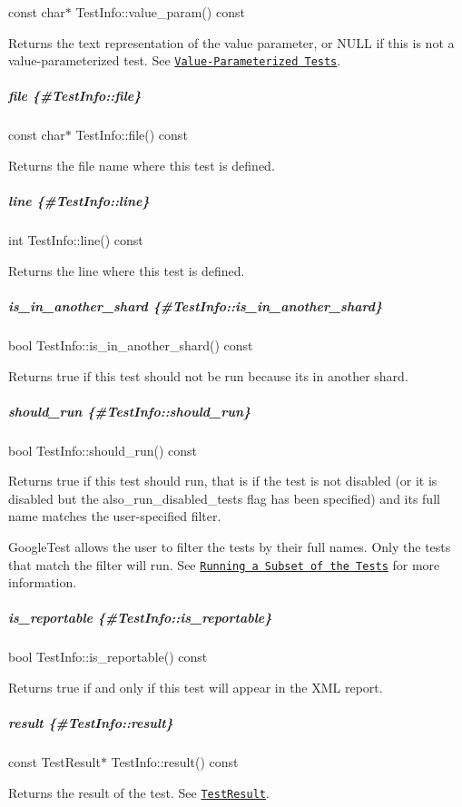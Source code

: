 {\ttfamily const char$\ast$ Test\+Info\+::value\+\_\+param() const}

Returns the text representation of the value parameter, or {\ttfamily N\+U\+LL} if this is not a value-\/parameterized test. See \href{../advanced.md#value-parameterized-tests}{\tt Value-\/\+Parameterized Tests}.

\subparagraph*{file \{\#\+Test\+Info\+::file\}}

{\ttfamily const char$\ast$ Test\+Info\+::file() const}

Returns the file name where this test is defined.

\subparagraph*{line \{\#\+Test\+Info\+::line\}}

{\ttfamily int Test\+Info\+::line() const}

Returns the line where this test is defined.

\subparagraph*{is\+\_\+in\+\_\+another\+\_\+shard \{\#\+Test\+Info\+::is\+\_\+in\+\_\+another\+\_\+shard\}}

{\ttfamily bool Test\+Info\+::is\+\_\+in\+\_\+another\+\_\+shard() const}

Returns true if this test should not be run because it\textquotesingle{}s in another shard.

\subparagraph*{should\+\_\+run \{\#\+Test\+Info\+::should\+\_\+run\}}

{\ttfamily bool Test\+Info\+::should\+\_\+run() const}

Returns true if this test should run, that is if the test is not disabled (or it is disabled but the {\ttfamily also\+\_\+run\+\_\+disabled\+\_\+tests} flag has been specified) and its full name matches the user-\/specified filter.

Google\+Test allows the user to filter the tests by their full names. Only the tests that match the filter will run. See \href{../advanced.md#running-a-subset-of-the-tests}{\tt Running a Subset of the Tests} for more information.

\subparagraph*{is\+\_\+reportable \{\#\+Test\+Info\+::is\+\_\+reportable\}}

{\ttfamily bool Test\+Info\+::is\+\_\+reportable() const}

Returns true if and only if this test will appear in the X\+ML report.

\subparagraph*{result \{\#\+Test\+Info\+::result\}}

{\ttfamily const Test\+Result$\ast$ Test\+Info\+::result() const}

Returns the result of the test. See \href{#TestResult}{\tt {\ttfamily Test\+Result}}.

